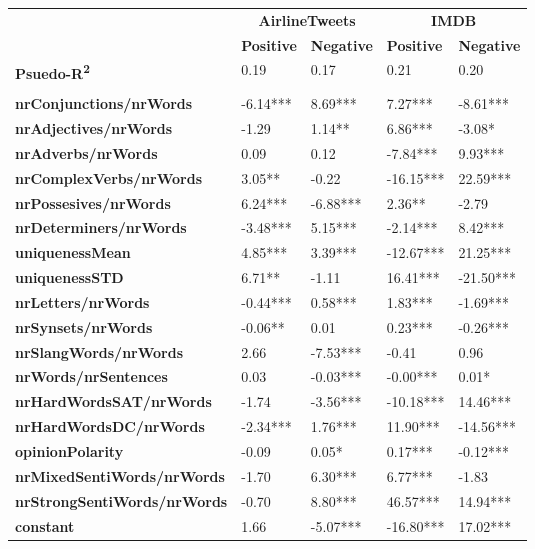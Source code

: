 \begin{tabular}{|l|l|l|l|l|} \cline{2-5}
\multicolumn{1}{c|}{} & \multicolumn{2}{c|}{\textbf{AirlineTweets}} & \multicolumn{2}{c|}{\textbf{IMDB}}\\ \cline{2-5}
\multicolumn{1}{c|}{} & \textbf{Positive} & \textbf{Negative} & \textbf{Positive} & \textbf{Negative} \\ \hline
\textbf{Psuedo-R\textsuperscript{2}} & 0.19 & 0.17 & 0.21 & 0.20\\ \hline
 \multicolumn{3}{c}{} \\ [-1.5ex] \hline
\textbf{nrConjunctions/nrWords} & -6.14*** & \phantom{-}8.69*** & \phantom{-}7.27*** & -8.61*** \\ \hline
\textbf{nrAdjectives/nrWords} & -1.29 & \phantom{-}1.14** & \phantom{-}6.86*** & -3.08* \\ \hline
\textbf{nrAdverbs/nrWords} & \phantom{-}0.09 & \phantom{-}0.12 & -7.84*** & \phantom{-}9.93*** \\ \hline
\textbf{nrComplexVerbs/nrWords} & \phantom{-}3.05** & -0.22 & -16.15*** & \phantom{-}22.59*** \\ \hline
\textbf{nrPossesives/nrWords} & \phantom{-}6.24*** & -6.88*** & \phantom{-}2.36** & -2.79 \\ \hline
\textbf{nrDeterminers/nrWords} & -3.48*** & \phantom{-}5.15*** & -2.14*** & \phantom{-}8.42*** \\ \hline
\textbf{uniquenessMean} & \phantom{-}4.85*** & \phantom{-}3.39*** & -12.67*** & \phantom{-}21.25*** \\ \hline
\textbf{uniquenessSTD} & \phantom{-}6.71** & -1.11 & \phantom{-}16.41*** & -21.50*** \\ \hline
\textbf{nrLetters/nrWords} & -0.44*** & \phantom{-}0.58*** & \phantom{-}1.83*** & -1.69*** \\ \hline
\textbf{nrSynsets/nrWords} & -0.06** & \phantom{-}0.01 & \phantom{-}0.23*** & -0.26*** \\ \hline
\textbf{nrSlangWords/nrWords} & \phantom{-}2.66 & -7.53*** & -0.41 & \phantom{-}0.96 \\ \hline
\textbf{nrWords/nrSentences} & \phantom{-}0.03 & -0.03*** & -0.00*** & \phantom{-}0.01* \\ \hline
\textbf{nrHardWordsSAT/nrWords} & -1.74 & -3.56*** & -10.18*** & \phantom{-}14.46*** \\ \hline
\textbf{nrHardWordsDC/nrWords} & -2.34*** & \phantom{-}1.76*** & \phantom{-}11.90*** & -14.56*** \\ \hline
\textbf{opinionPolarity} & -0.09 & \phantom{-}0.05* & \phantom{-}0.17*** & -0.12*** \\ \hline
\textbf{nrMixedSentiWords/nrWords} & -1.70 & \phantom{-}6.30*** & \phantom{-}6.77*** & -1.83 \\ \hline
\textbf{nrStrongSentiWords/nrWords} & -0.70 & \phantom{-}8.80*** & \phantom{-}46.57*** & \phantom{-}14.94*** \\ \hline
\textbf{constant} & \phantom{-}1.66 & -5.07*** & -16.80*** & \phantom{-}17.02*** \\ \hline
\end{tabular}